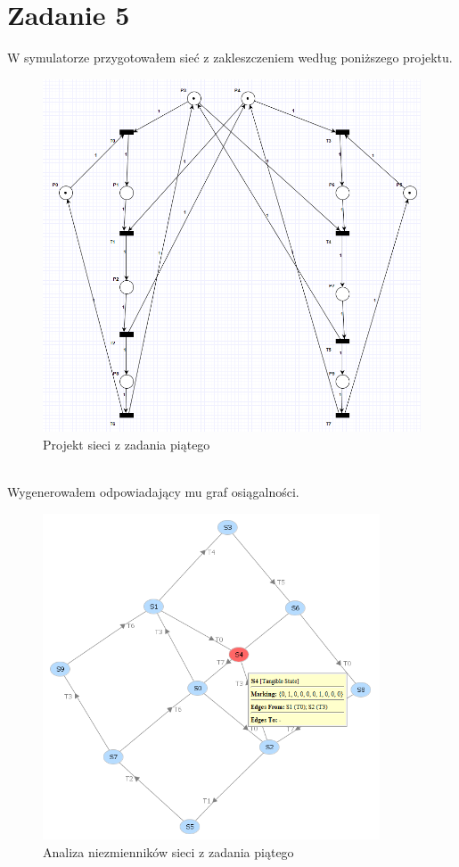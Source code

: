 \documentclass{article}
\begin{document}
    \newpage
    \section{Zadanie 5}
        W symulatorze przygotowałem sieć z zakleszczeniem według poniższego projektu.
        \begin{figure}[h!]
            \centering
            \includegraphics[width=17cm]{lab6/n5.png}
            \caption{Projekt sieci z zadania piątego}
        \end{figure}\\
        \FloatBarrier
        Wygenerowałem odpowiadający mu graf osiągalności. 
        \begin{figure}[h!]
            \centering
            \includegraphics[width=10cm]{lab6/n5_3.png}
            \caption{Analiza niezmienników sieci z zadania piątego}
        \end{figure}\\
\end{document}
